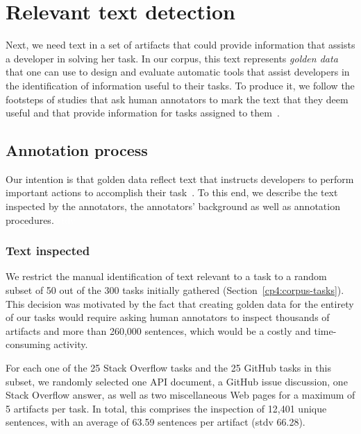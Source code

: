 


\section{Relevant text detection}
\label{cp4:corpus-relevant-text}




Next, we need text in a set of artifacts that could provide information that assists a developer in solving her task.
In our corpus, this text represents \textit{golden data} that one can use to design and evaluate automatic tools that assist developers in the identification of information useful to their tasks. 
To produce it, we follow the footsteps of studies that 
ask human annotators to
mark the text that they deem useful and that provide information for tasks assigned to them~\cite{nadi2020, Robillard2015, marques2020}.



\subsection{Annotation process}


Our intention is that golden data reflect text that instructs developers to perform important actions to accomplish their task~\cite{Robillard2015, Lotufo2012}.
To this end, we describe the text inspected by the annotators, the annotators' background as well as annotation procedures.
\textcolor{white}{\acs{stdv}} %



\subsubsection{Text inspected}




We restrict the manual identification of text relevant to a task to a random subset of 
50  out of the 300  tasks initially gathered (Section~\ref{cp4:corpus-tasks}).
This decision was motivated by the fact that 
creating golden data for the entirety of our tasks 
would require asking human annotators to inspect thousands of artifacts and more than 260,000 sentences, which would be a costly and time-consuming activity. 


For each one of the 25 Stack Overflow tasks and the 25 GitHub tasks in this subset, we randomly selected 
one API document, a GitHub issue discussion, one Stack Overflow answer, as well as two miscellaneous Web pages for a maximum of 5 artifacts per task.
In total, this comprises the inspection of  
12,401 unique sentences, with an average of 63.59 sentences per artifact (stdv 66.28).



